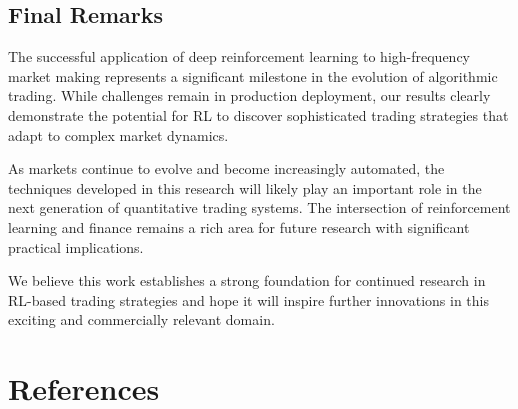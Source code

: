 \documentclass[conference]{IEEEtran}
\begin{document}
\subsection{Final Remarks}

The successful application of deep reinforcement learning to high-frequency market making represents a significant milestone in the evolution of algorithmic trading. While challenges remain in production deployment, our results clearly demonstrate the potential for RL to discover sophisticated trading strategies that adapt to complex market dynamics.

As markets continue to evolve and become increasingly automated, the techniques developed in this research will likely play an important role in the next generation of quantitative trading systems. The intersection of reinforcement learning and finance remains a rich area for future research with significant practical implications.

We believe this work establishes a strong foundation for continued research in RL-based trading strategies and hope it will inspire further innovations in this exciting and commercially relevant domain.



\section*{References}
\end{document}
